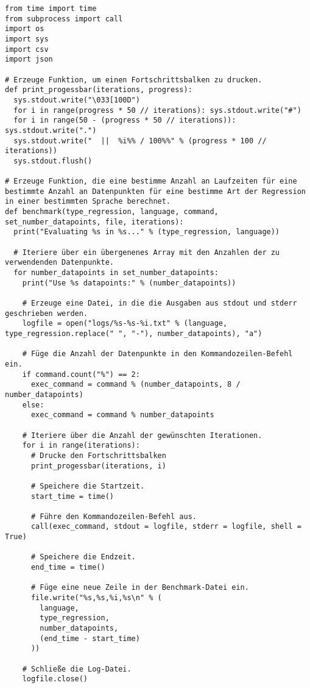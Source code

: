 \begin{verbatim}
from time import time
from subprocess import call
import os
import sys
import csv
import json

# Erzeuge Funktion, um einen Fortschrittsbalken zu drucken.
def print_progessbar(iterations, progress):
  sys.stdout.write("\033[100D")
  for i in range(progress * 50 // iterations): sys.stdout.write("#")
  for i in range(50 - (progress * 50 // iterations)): sys.stdout.write(".")
  sys.stdout.write("  ||  %i%% / 100%%" % (progress * 100 // iterations))
  sys.stdout.flush()

# Erzeuge Funktion, die eine bestimme Anzahl an Laufzeiten für eine bestimmte Anzahl an Datenpunkten für eine bestimme Art der Regression in einer bestimmten Sprache berechnet.
def benchmark(type_regression, language, command, set_number_datapoints, file, iterations):
  print("Evaluating %s in %s..." % (type_regression, language))

  # Iteriere über ein übergenenes Array mit den Anzahlen der zu verwendenden Datenpunkte.
  for number_datapoints in set_number_datapoints:
    print("Use %s datapoints:" % (number_datapoints))

    # Erzeuge eine Datei, in die die Ausgaben aus stdout und stderr geschrieben werden.
    logfile = open("logs/%s-%s-%i.txt" % (language, type_regression.replace(" ", "-"), number_datapoints), "a")

    # Füge die Anzahl der Datenpunkte in den Kommandozeilen-Befehl ein.
    if command.count("%") == 2:
      exec_command = command % (number_datapoints, 8 / number_datapoints)
    else:
      exec_command = command % number_datapoints

    # Iteriere über die Anzahl der gewünschten Iterationen.
    for i in range(iterations):
      # Drucke den Fortschrittsbalken
      print_progessbar(iterations, i)

      # Speichere die Startzeit.
      start_time = time()

      # Führe den Kommandozeilen-Befehl aus.
      call(exec_command, stdout = logfile, stderr = logfile, shell = True)

      # Speichere die Endzeit.
      end_time = time()

      # Füge eine neue Zeile in der Benchmark-Datei ein.
      file.write("%s,%s,%i,%s\n" % (
        language,
        type_regression,
        number_datapoints,
        (end_time - start_time)
      ))

    # Schließe die Log-Datei.
    logfile.close()


\end{verbatim}
